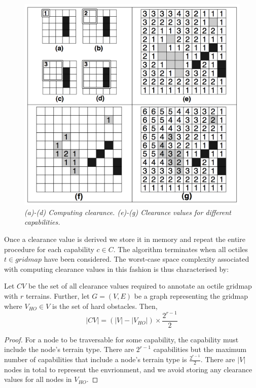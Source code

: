 \begin{figure}[htbp]
	\vspace{-12pt}
       \caption{\emph{(a)-(d) Computing clearance. (e)-(g) Clearance values for different capabilities.}}
       \begin{center}
                       \includegraphics[scale=0.25, trim = 20mm 7mm 20mm 5mm]{diagrams/annotations.png}
       \end{center}
       \label{aha-fig:annotations}
	\vspace{-5pt}
\end{figure}

Once a clearance value is derived we store it in memory and repeat the entire procedure for each capability $c \in C$.  
The algorithm terminates when all octiles $t \in gridmap$ have been considered. 
The worst-case space complexity associated with computing clearance values in this fashion is thus characterised by: 
\begin{lemma}
\label{aha-lemma:numannotations}
Let $CV$ be the set of all clearance values required to annotate an octile gridmap with $r$ terrains. Further, let $G = (V, E)$ be a graph representing the gridmap where $V_{HO} \in V$ is the set of hard obstacles. Then, 
$$|CV| = (|V| - |V_{HO}|)\times \frac{2^{r-1}}{2}$$
\end{lemma}

\begin{proof}
For a node to be traversable for some capability, the capability must include the node's terrain type. 
There are $2^{r-1}$ capabilities but the maximum number of capabilities that include a node's terrain type is $\frac{2^{r-1}}{2}$. 
There are $|V|$ nodes in total to represent the envrionment, and we avoid storing any clearance values for all nodes in $V_{HO}$. 
\end{proof}

